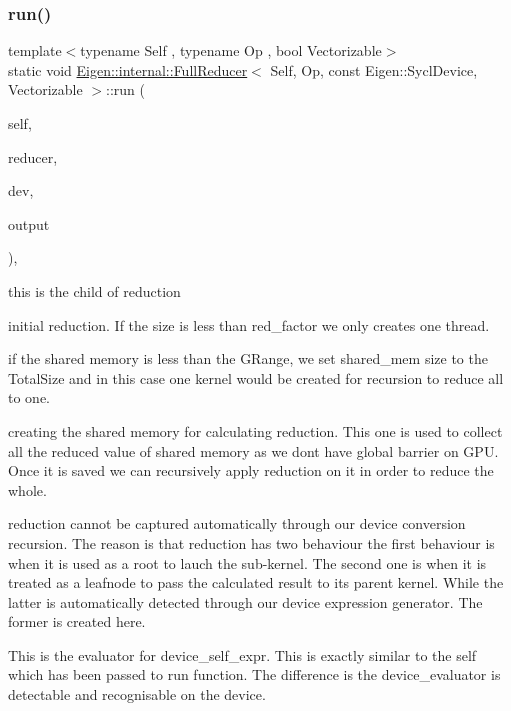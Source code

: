 \subsubsection{\texorpdfstring{run()}{run()}\hspace{0.1cm}{\footnotesize\ttfamily [1/2]}}
{\footnotesize\ttfamily template$<$typename Self , typename Op , bool Vectorizable$>$ \\
static void \hyperlink{struct_eigen_1_1internal_1_1_full_reducer}{Eigen\+::internal\+::\+Full\+Reducer}$<$ Self, Op, const Eigen\+::\+Sycl\+Device, Vectorizable $>$\+::run (\begin{DoxyParamCaption}\item[{const Self \&}]{self,  }\item[{Op \&}]{reducer,  }\item[{const Eigen\+::\+Sycl\+Device \&}]{dev,  }\item[{Coeff\+Return\+Type $\ast$}]{output }\end{DoxyParamCaption})\hspace{0.3cm}{\ttfamily [inline]}, {\ttfamily [static]}}

this is the child of reduction

initial reduction. If the size is less than red\+\_\+factor we only creates one thread.

if the shared memory is less than the G\+Range, we set shared\+\_\+mem size to the Total\+Size and in this case one kernel would be created for recursion to reduce all to one.

creating the shared memory for calculating reduction. This one is used to collect all the reduced value of shared memory as we dont have global barrier on G\+PU. Once it is saved we can recursively apply reduction on it in order to reduce the whole.

reduction cannot be captured automatically through our device conversion recursion. The reason is that reduction has two behaviour the first behaviour is when it is used as a root to lauch the sub-\/kernel. The second one is when it is treated as a leafnode to pass the calculated result to its parent kernel. While the latter is automatically detected through our device expression generator. The former is created here.

This is the evaluator for device\+\_\+self\+\_\+expr. This is exactly similar to the self which has been passed to run function. The difference is the device\+\_\+evaluator is detectable and recognisable on the device.

